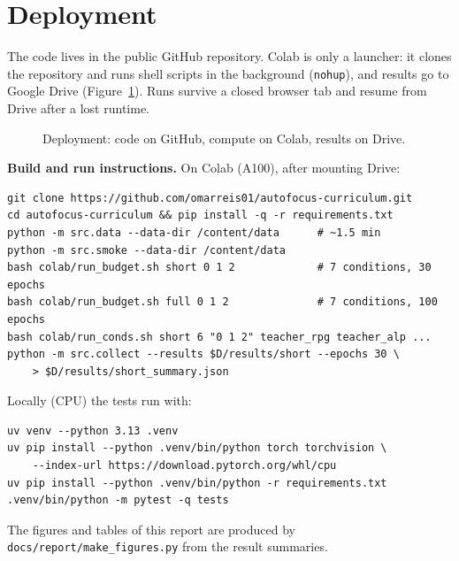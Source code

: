 \documentclass[a4paper,12pt]{report}
\begin{document}
\section{Deployment}

The code lives in the public GitHub repository. Colab is only a launcher: it clones the repository and runs shell scripts in the background (\texttt{nohup}), and results go to Google Drive (Figure~\ref{fig:deploy}). Runs survive a closed browser tab and resume from Drive after a lost runtime.

\begin{figure}[htbp]
\centering
{}
\caption{Deployment: code on GitHub, compute on Colab, results on Drive.}
\label{fig:deploy}
\end{figure}

\textbf{Build and run instructions.} On Colab (A100), after mounting Drive:
{\footnotesize
\begin{verbatim}
git clone https://github.com/omarreis01/autofocus-curriculum.git
cd autofocus-curriculum && pip install -q -r requirements.txt
python -m src.data --data-dir /content/data      # ~1.5 min
python -m src.smoke --data-dir /content/data
bash colab/run_budget.sh short 0 1 2             # 7 conditions, 30 epochs
bash colab/run_budget.sh full 0 1 2              # 7 conditions, 100 epochs
bash colab/run_conds.sh short 6 "0 1 2" teacher_rpg teacher_alp ...
python -m src.collect --results $D/results/short --epochs 30 \
    > $D/results/short_summary.json
\end{verbatim}
}
\noindent Locally (CPU) the tests run with:
{\footnotesize
\begin{verbatim}
uv venv --python 3.13 .venv
uv pip install --python .venv/bin/python torch torchvision \
    --index-url https://download.pytorch.org/whl/cpu
uv pip install --python .venv/bin/python -r requirements.txt
.venv/bin/python -m pytest -q tests
\end{verbatim}
}
\noindent The figures and tables of this report are produced by \texttt{docs/report/make\_figures.py} from the result summaries.
\end{document}
